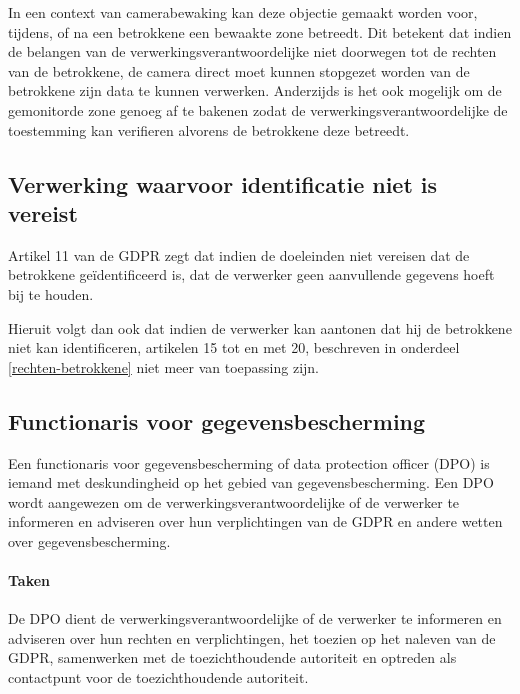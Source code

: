 In een context van camerabewaking kan deze objectie gemaakt worden voor, tijdens, of na een betrokkene een bewaakte zone betreedt. Dit betekent dat indien de belangen van de verwerkingsverantwoordelijke niet doorwegen tot de rechten van de betrokkene, de camera direct moet kunnen stopgezet worden van de betrokkene zijn data te kunnen verwerken. Anderzijds is het ook mogelijk om de gemonitorde zone genoeg af te bakenen zodat de verwerkingsverantwoordelijke de toestemming kan verifieren alvorens de betrokkene deze betreedt. \autocite{edpb2019guidelines}


\subsection{Verwerking waarvoor identificatie niet is vereist}
Artikel 11 van de GDPR zegt dat indien de doeleinden niet vereisen dat de betrokkene geïdentificeerd is, dat de verwerker geen aanvullende gegevens hoeft bij te houden.
\par
Hieruit volgt dan ook dat indien de verwerker kan aantonen dat hij de betrokkene niet kan identificeren, artikelen 15 tot en met 20, beschreven in onderdeel \ref{rechten-betrokkene} niet meer van toepassing zijn.

\subsection{Functionaris voor gegevensbescherming}
Een functionaris voor gegevensbescherming of data protection officer (DPO) is iemand met deskundingheid op het gebied van gegevensbescherming. Een DPO wordt aangewezen om de verwerkingsverantwoordelijke of de verwerker te informeren en adviseren over hun verplichtingen van de GDPR en andere wetten over gegevensbescherming.

\paragraph{Taken}
De DPO dient de verwerkingsverantwoordelijke of de verwerker te informeren en adviseren over hun rechten en verplichtingen, het toezien op het naleven van de GDPR, samenwerken met de toezichthoudende autoriteit en optreden als contactpunt voor de toezichthoudende autoriteit.

